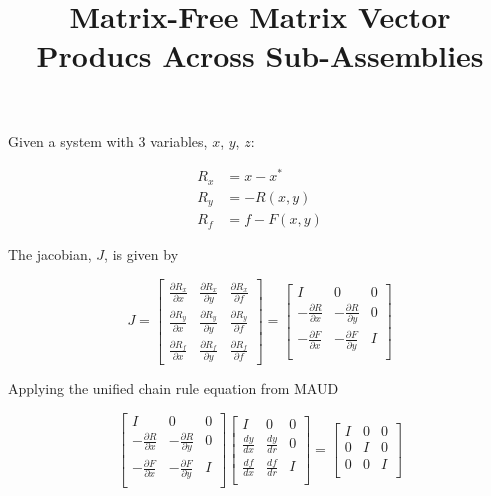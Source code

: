 \documentclass[12pt]{article}
\title {Matrix-Free Matrix Vector Producs Across Sub-Assemblies}
\begin{document}
\maketitle
Given a system with 3 variables, $x$, $y$, $z$:

\begin{align}
  R_x &= x - x^* \\
  R_y &= -R(x, y) \\
  R_f &= f - F(x,y)
\end{align}

The jacobian, $J$, is given by

\begin{equation}
  J = \begin{bmatrix}
  \frac{\partial R_x}{\partial x} & \frac{\partial R_x}{\partial y} & \frac{\partial R_x}{\partial f} \\
  \frac{\partial R_y}{\partial x} & \frac{\partial R_y}{\partial y} & \frac{\partial R_y}{\partial f} \\
  \frac{\partial R_f}{\partial x} & \frac{\partial R_f}{\partial y} & \frac{\partial R_f}{\partial f}
      \end{bmatrix}
  = \begin{bmatrix}
  I & 0 & 0 \\
  -\frac{\partial R}{\partial x} & -\frac{\partial R}{\partial y} & 0\\
  -\frac{\partial F}{\partial x} & -\frac{\partial F}{\partial y} & I\\
      \end{bmatrix}
\end{equation}

Applying the unified chain rule equation from MAUD

\begin{equation}
  \begin{bmatrix}
  I & 0 & 0 \\
  -\frac{\partial R}{\partial x} & -\frac{\partial R}{\partial y} & 0\\
  -\frac{\partial F}{\partial x} & -\frac{\partial F}{\partial y} & I\\
  \end{bmatrix}
  \begin{bmatrix}
  I & 0 & 0 \\
  \frac{d y}{d x} & \frac{d y}{d r} & 0\\
  \frac{d f}{d x} & \frac{d f}{d r} & I\\
  \end{bmatrix}
  =
  \begin{bmatrix}
  I & 0 & 0 \\
  0 & I & 0\\
  0 & 0 & I\\
  \end{bmatrix}
  \label{ucr}
\end{equation}
\end{document}
